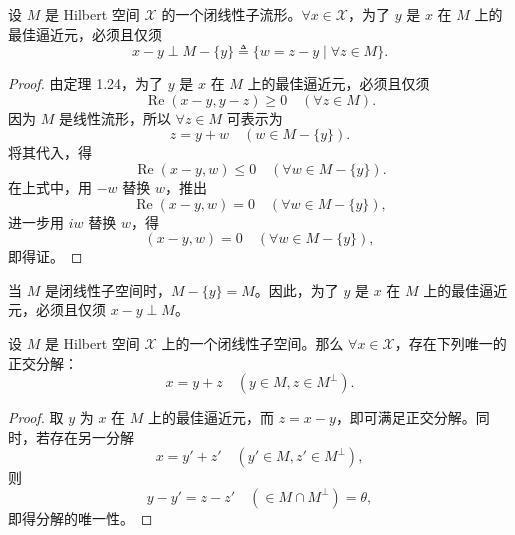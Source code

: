 \documentclass[lang=cn,newtx,10pt,scheme=chinese,thmcnt=chapter]{elegantbook}
\begin{document}
\begin{corollary}
设 $M$ 是 Hilbert 空间 $\mathscr{X}$ 的一个闭线性子流形。$\forall x \in \mathscr{X}$，为了 $y$ 是 $x$ 在 $M$ 上的最佳逼近元，必须且仅须
\begin{equation*}
x - y \perp M - \{y\} \triangleq \{w = z - y \mid \forall z \in M\}.
\end{equation*}
\end{corollary}

\begin{proof}
由定理 1.24，为了 $y$ 是 $x$ 在 $M$ 上的最佳逼近元，必须且仅须
\begin{equation*}
\operatorname{Re}(x - y, y - z) \geqslant 0 \quad (\forall z \in M).
\end{equation*}
因为 $M$ 是线性流形，所以 $\forall z \in M$ 可表示为
\begin{equation*}
z = y + w \quad (w \in M - \{y\}).
\end{equation*}
将其代入，得
\begin{equation*}
\operatorname{Re}(x - y, w) \leqslant 0 \quad (\forall w \in M - \{y\}).
\end{equation*}
在上式中，用 $-w$ 替换 $w$，推出
\begin{equation*}
\operatorname{Re}(x - y, w) = 0 \quad (\forall w \in M - \{y\}),
\end{equation*}
进一步用 $iw$ 替换 $w$，得
\begin{equation*}
(x - y, w) = 0 \quad (\forall w \in M - \{y\}),
\end{equation*}
即得证。
\end{proof}

\begin{example}
当 $M$ 是闭线性子空间时，$M - \{y\} = M$。因此，为了 $y$ 是 $x$ 在 $M$ 上的最佳逼近元，必须且仅须 $x - y \perp M$。
\end{example}

\begin{corollary}
设 $M$ 是 Hilbert 空间 $\mathscr{X}$ 上的一个闭线性子空间。那么 $\forall x \in \mathscr{X}$，存在下列唯一的正交分解：
\begin{equation*}
x = y + z \quad \left(y \in M, z \in M^\perp\right).
\end{equation*}
\end{corollary}

\begin{proof}
取 $y$ 为 $x$ 在 $M$ 上的最佳逼近元，而 $z = x - y$，即可满足正交分解。同时，若存在另一分解
\begin{equation*}
x = y' + z' \quad \left(y' \in M, z' \in M^\perp\right),
\end{equation*}
则
\begin{equation*}
y - y' = z - z' \quad (\in M \cap M^\perp) = \theta,
\end{equation*}
即得分解的唯一性。
\end{proof}
\end{document}
